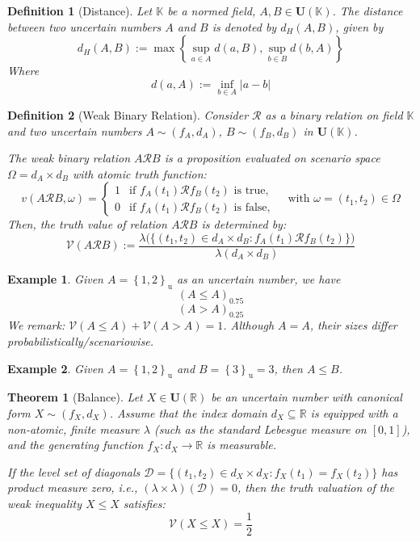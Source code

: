 \documentclass[a4paper,12pt, twoside]{memoir}
\newtheorem{definition}{Definition}[chapter]
\newtheorem{theorem}{Theorem}[chapter]
\newtheorem{example}{Example}[chapter]
\newcommand{\set}[1]{\left\{#1\right\}} %
\newcommand{\s}[1]{\set{#1}_\mathrm{u}} %
\newcommand{\tsbd}[1]{\mathbf{U}(\mathbb{#1})}
\newcommand{\ddclmd}{\mathcal{V}} %
\newcommand{\gtcl}[2]{\left(#1\right)_{#2}} %
\begin{document}
\begin{definition}[Distance]
	Let $\mathbb{K}$ be a normed field, $A, B \in \tsbd{K}$. The distance between two uncertain numbers $A$ and $B$ is denoted by $d_H(A,B)$, given by
	$$
		d_H(A,B) := \max\left\{\sup_{a \in A}{d(a,B),\sup_{b \in B}{d(b,A)}}\right\}
	$$
	Where
	$$d(a,A) := \inf_{b\in A}{|a-b|}$$
\end{definition}

\begin{definition}[Weak Binary Relation]
	Consider $\mathcal{R}$ as a binary relation on field $\mathbb{K}$ and two uncertain numbers $A \sim (f_A, d_A)$, $B \sim (f_B, d_B)$ in $\mathbf{U}(\mathbb{K})$.

	The weak binary relation $A \mathcal{R} B$ is a proposition evaluated on scenario space $\Omega = d_A \times d_B$ with atomic truth function:
	\[
		v(A \mathcal{R} B, \omega) = \begin{cases}
			1 & \text{if } f_A(t_1) \mathcal{R} f_B(t_2) \text{ is true},  \\
			0 & \text{if } f_A(t_1) \mathcal{R} f_B(t_2) \text{ is false},
		\end{cases} \quad \text{with } \omega = (t_1, t_2) \in \Omega
	\]
	Then, the truth value of relation $A \mathcal{R} B$ is determined by:
	\[
		\ddclmd(A \mathcal{R} B) := \frac{\lambda\big(\{(t_1, t_2) \in d_A \times d_B : f_A(t_1) \mathcal{R} f_B(t_2)\}\big)}{\lambda(d_A \times d_B)}
	\]
\end{definition}

\begin{example}
	Given $A = \s{1,2}$ as an uncertain number, we have $$\gtcl{A\leq A}{0.75}$$ $$\gtcl{A>A}{0.25}$$
	We remark: $\ddclmd(A\leq A) + \ddclmd(A>A) = 1$. Although $A=A$, their sizes differ probabilistically/scenariowise.
\end{example}

\begin{example}
	Given $A = \s{1,2}$ and $B = \s{3} = 3$, then $A \leq B$.
\end{example}

\begin{theorem}[Balance]
	\label{thm:balance}
	Let $X \in \tsbd{R}$ be an uncertain number with canonical form $X \sim (f_X, d_X)$. Assume that the index domain $d_X \subseteq \mathbb{R}$ is equipped with a non-atomic, finite measure $\lambda$ (such as the standard Lebesgue measure on $[0, 1]$), and the generating function $f_X: d_X \to \mathbb{R}$ is measurable.

	If the level set of diagonals $\mathcal{D} = \{(t_1, t_2) \in d_X \times d_X : f_X(t_1) = f_X(t_2)\}$ has product measure zero, i.e., $(\lambda \times \lambda)(\mathcal{D}) = 0$, then the truth valuation of the weak inequality $X \leq X$ satisfies:
	\[
		\ddclmd(X \leq X) = \frac{1}{2}
	\]
\end{theorem}
\end{document}
